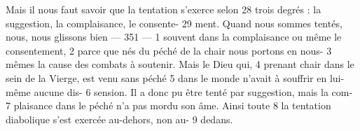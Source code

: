 Mais il nous faut savoir que la tentation s'exerce selon	 
28	 	trois degrés : la suggestion, la complaisance, le consente-	 
29	 	ment. Quand nous sommes tentés, nous, nous glissons bien	 
 	--- 351 ---	 
1	 	souvent dans la complaisance ou même le consentement,	 
2	 	parce que nés du péché de la chair nous portons en nous-	 
3	 	mêmes la cause des combats à soutenir. Mais le Dieu qui,	 
4	 	prenant chair dans le sein de la Vierge, est venu sans péché	 
5	 	dans le monde n'avait à souffrir en lui-même aucune dis-	 
6	 	sension. Il a donc pu être tenté par suggestion, mais la com-	 
7	 	plaisance dans le péché n'a pas mordu son âme. Ainsi toute	 
8	 	la tentation diabolique s'est exercée au-dehors, non au-	 
9	 	dedans.